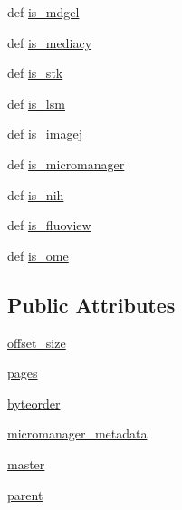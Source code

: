 \begin{DoxyCompactItemize}
def \hyperlink{classtifffile_1_1_tiff_file_a48749abc5c5eaf5e11cd731104c22cb9}{is\-\_\-mdgel}
\item 
def \hyperlink{classtifffile_1_1_tiff_file_a491c0c01ccff753773477ff0adc2b1c3}{is\-\_\-mediacy}
\item 
def \hyperlink{classtifffile_1_1_tiff_file_a3aef6d37c74dc3c2ae8d319f1680e4cd}{is\-\_\-stk}
\item 
def \hyperlink{classtifffile_1_1_tiff_file_a4b62231ac45a69f35b4eebe2cafd9233}{is\-\_\-lsm}
\item 
def \hyperlink{classtifffile_1_1_tiff_file_a57ccede80811571fa599f67771f35c6a}{is\-\_\-imagej}
\item 
def \hyperlink{classtifffile_1_1_tiff_file_a3ae5c2e4f211833e4d830c1af04b9b9f}{is\-\_\-micromanager}
\item 
def \hyperlink{classtifffile_1_1_tiff_file_a4b98fd0ade83b2679ecd2da1230196a1}{is\-\_\-nih}
\item 
def \hyperlink{classtifffile_1_1_tiff_file_a1f6562d875ce250d67b1566aaf49d9f7}{is\-\_\-fluoview}
\item 
def \hyperlink{classtifffile_1_1_tiff_file_acab85c4f4398924ad3cc041ef4beee90}{is\-\_\-ome}
\end{DoxyCompactItemize}
\subsection*{Public Attributes}
\begin{DoxyCompactItemize}
\item 
\hyperlink{classtifffile_1_1_tiff_file_ab531ab5699a9b426c32e26444e8e53ac}{offset\-\_\-size}
\item 
\hyperlink{classtifffile_1_1_tiff_file_a38687a2ea2711cef070cf0b9ddb4e65f}{pages}
\item 
\hyperlink{classtifffile_1_1_tiff_file_a9482f0d20fef11df3b9baaa04f8a7bb6}{byteorder}
\item 
\hyperlink{classtifffile_1_1_tiff_file_ad38661d0b0a16180347517d5ff208afd}{micromanager\-\_\-metadata}
\item 
\hyperlink{classtifffile_1_1_tiff_file_acc082b0de522251b75669336fe57b005}{master}
\item 
\hyperlink{classtifffile_1_1_tiff_file_a29b8b6eb049a61de92b16223f75492e0}{parent}
\end{DoxyCompactItemize}


